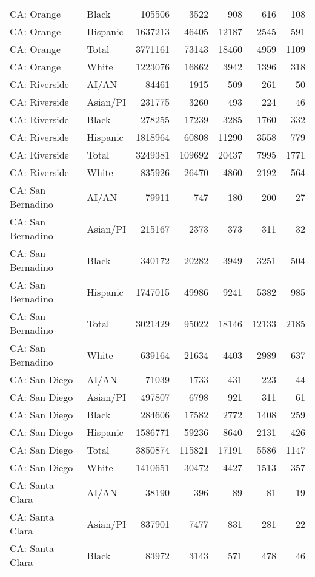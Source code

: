 \documentclass[9pt,twoside,lineno]{pnas-new}
\begin{document}
\begin{table}[ht]
\begin{tabular}{llrrrrr}
  CA: Orange & Black & 105506 & 3522 & 908 & 616 & 108 \\ 
  CA: Orange & Hispanic & 1637213 & 46405 & 12187 & 2545 & 591 \\ 
  CA: Orange & Total & 3771161 & 73143 & 18460 & 4959 & 1109 \\ 
  CA: Orange & White & 1223076 & 16862 & 3942 & 1396 & 318 \\ 
  CA: Riverside & AI/AN & 84461 & 1915 & 509 & 261 & 50 \\ 
  CA: Riverside & Asian/PI & 231775 & 3260 & 493 & 224 & 46 \\ 
  CA: Riverside & Black & 278255 & 17239 & 3285 & 1760 & 332 \\ 
  CA: Riverside & Hispanic & 1818964 & 60808 & 11290 & 3558 & 779 \\ 
  CA: Riverside & Total & 3249381 & 109692 & 20437 & 7995 & 1771 \\ 
  CA: Riverside & White & 835926 & 26470 & 4860 & 2192 & 564 \\ 
  CA: San Bernadino & AI/AN & 79911 & 747 & 180 & 200 & 27 \\ 
  CA: San Bernadino & Asian/PI & 215167 & 2373 & 373 & 311 & 32 \\ 
  CA: San Bernadino & Black & 340172 & 20282 & 3949 & 3251 & 504 \\ 
  CA: San Bernadino & Hispanic & 1747015 & 49986 & 9241 & 5382 & 985 \\ 
  CA: San Bernadino & Total & 3021429 & 95022 & 18146 & 12133 & 2185 \\ 
  CA: San Bernadino & White & 639164 & 21634 & 4403 & 2989 & 637 \\ 
  CA: San Diego & AI/AN & 71039 & 1733 & 431 & 223 & 44 \\ 
  CA: San Diego & Asian/PI & 497807 & 6798 & 921 & 311 & 61 \\ 
  CA: San Diego & Black & 284606 & 17582 & 2772 & 1408 & 259 \\ 
  CA: San Diego & Hispanic & 1586771 & 59236 & 8640 & 2131 & 426 \\ 
  CA: San Diego & Total & 3850874 & 115821 & 17191 & 5586 & 1147 \\ 
  CA: San Diego & White & 1410651 & 30472 & 4427 & 1513 & 357 \\ 
  CA: Santa Clara & AI/AN & 38190 & 396 & 89 & 81 & 19 \\ 
  CA: Santa Clara & Asian/PI & 837901 & 7477 & 831 & 281 & 22 \\ 
  CA: Santa Clara & Black & 83972 & 3143 & 571 & 478 & 46 \\ 

\end{tabular}
\end{table}
\end{document}
